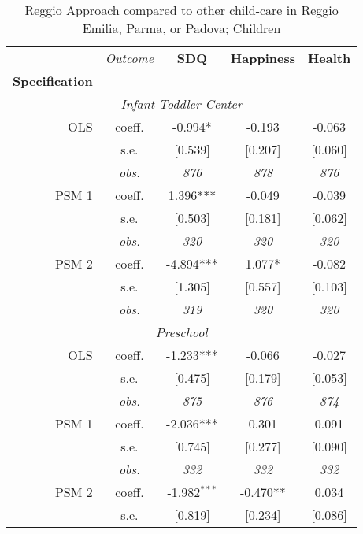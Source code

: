 \begin{table}[H] 
\caption{Reggio Approach compared to other child-care in Reggio Emilia, Parma, or Padova; Children}
\label{tab:resultsChildren-all}
 \begin{centering} 
\vspace{1ex}
\begin{tabular}{ r c ccc} 
\hline \hline 
 & {\textit{Outcome}} & \textbf{SDQ}  & \textbf{Happiness} & \textbf{Health}  \\ 
\textbf{Specification}  &  &  &  &  \\ 
\hline 
\multicolumn{5}{c}{\textit{Infant Toddler Center }} \\ 
\hline 

OLS	 & coeff.	 & -0.994*	 & -0.193	 & -0.063	\\
	 & s.e.	 & [0.539]	 & [0.207]	 & [0.060]	\\
	 & \textit{obs.}	 & \textit{876}	 & \textit{878}	 & \textit{876}	\\
PSM 1	 & coeff.	 & 1.396*** & -0.049	 & -0.039	\\
	 & s.e.	 & [0.503]	 & [0.181]	 & [0.062]	\\
	 & \textit{obs.}	 & \textit{320}	 & \textit{320}	 & \textit{320}	\\
PSM 2	 & coeff.	 & -4.894***	 & 1.077*	 & -0.082	\\
	 & s.e.	 & [1.305]	 & [0.557]	 & [0.103]	\\
	 & \textit{obs.}	 & \textit{319}	 & \textit{320}	 & \textit{320}	\\
\hline \multicolumn{5}{c}{\textit{Preschool }} \\ \hline
OLS	 & coeff.	 & -1.233*** & -0.066 & -0.027	\\
	 & s.e.	 & [0.475]	 & [0.179]	 & [0.053]	\\
	 & \textit{obs.}	 & \textit{875}	 & \textit{876}	 & \textit{874}	\\
PSM 1	 & coeff.	 & -2.036***	 & 0.301	 & 0.091\\
	 & s.e.	 & [0.745]	 & [0.277]	 & [0.090]	\\
	 & \textit{obs.}	 & \textit{332}	 & \textit{332}	 & \textit{332}	\\
PSM 2	 & coeff.	 & -1.982$^{***}$	 & -0.470**	 & 0.034	\\
	 & s.e.	 & [0.819]	 & [0.234]	 & [0.086]	\\

\end{tabular}
\end{centering}
\end{table}
